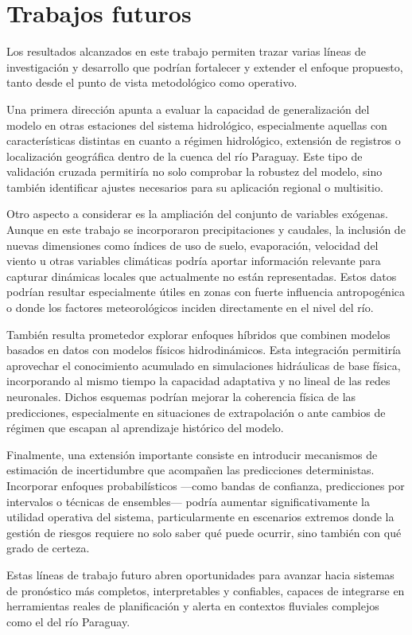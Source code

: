 \section{Trabajos futuros}

Los resultados alcanzados en este trabajo permiten trazar varias líneas de investigación y desarrollo que podrían fortalecer y extender el enfoque propuesto, tanto desde el punto de vista metodológico como operativo.

Una primera dirección apunta a evaluar la capacidad de generalización del modelo en otras estaciones del sistema hidrológico, especialmente aquellas con características distintas en cuanto a régimen hidrológico, extensión de registros o localización geográfica dentro de la cuenca del río Paraguay. Este tipo de validación cruzada permitiría no solo comprobar la robustez del modelo, sino también identificar ajustes necesarios para su aplicación regional o multisitio.

Otro aspecto a considerar es la ampliación del conjunto de variables exógenas. Aunque en este trabajo se incorporaron precipitaciones y caudales, la inclusión de nuevas dimensiones como índices de uso de suelo, evaporación, velocidad del viento u otras variables climáticas podría aportar información relevante para capturar dinámicas locales que actualmente no están representadas. Estos datos podrían resultar especialmente útiles en zonas con fuerte influencia antropogénica o donde los factores meteorológicos inciden directamente en el nivel del río.

También resulta prometedor explorar enfoques híbridos que combinen modelos basados en datos con modelos físicos hidrodinámicos. Esta integración permitiría aprovechar el conocimiento acumulado en simulaciones hidráulicas de base física, incorporando al mismo tiempo la capacidad adaptativa y no lineal de las redes neuronales. Dichos esquemas podrían mejorar la coherencia física de las predicciones, especialmente en situaciones de extrapolación o ante cambios de régimen que escapan al aprendizaje histórico del modelo.

Finalmente, una extensión importante consiste en introducir mecanismos de estimación de incertidumbre que acompañen las predicciones deterministas. Incorporar enfoques probabilísticos —como bandas de confianza, predicciones por intervalos o técnicas de ensembles— podría aumentar significativamente la utilidad operativa del sistema, particularmente en escenarios extremos donde la gestión de riesgos requiere no solo saber qué puede ocurrir, sino también con qué grado de certeza.

Estas líneas de trabajo futuro abren oportunidades para avanzar hacia sistemas de pronóstico más completos, interpretables y confiables, capaces de integrarse en herramientas reales de planificación y alerta en contextos fluviales complejos como el del río Paraguay.
